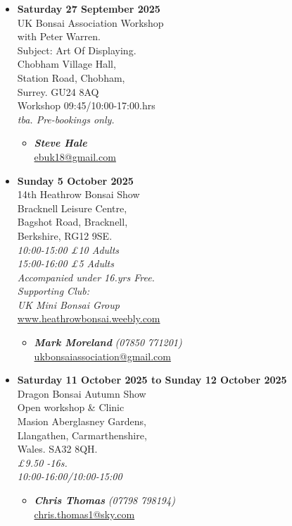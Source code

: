 \begin{itemize}
    \item \textbf{Saturday 27 September 2025}
    \\
    UK Bonsai Association Workshop \\
    with Peter Warren. \\
    Subject: Art Of Displaying. \\
    Chobham Village Hall, \\
    Station Road, Chobham, \\
    Surrey. GU24 8AQ \\
    Workshop 09:45/10:00-17:00.hrs
    \\
    \emph{tba. Pre-bookings only.}
    \begin{itemize}
        \item \textbf{\emph{Steve Hale}} \\
        \href{mailto:ebuk18@gmail.com}{ebuk18@gmail.com} 
    \end{itemize}

    \item \textbf{Sunday 5 October 2025}
    \\
    14th Heathrow Bonsai Show \\
    Bracknell Leisure Centre, \\
    Bagshot Road, Bracknell, \\
    Berkshire, RG12 9SE.
    \\
    \emph{10:00-15:00 £10 Adults} \\
    \emph{15:00-16:00 £5 Adults} \\
    \emph{Accompanied under 16.yrs Free.} \\
    \emph{Supporting Club:} \\
    \emph{UK Mini Bonsai Group}
    \\
    \href{http://www.heathrowbonsai.weebly.com/}{www.heathrowbonsai.weebly.com}
    \begin{itemize}
        \item \textbf{\emph{Mark Moreland}} \emph{(07850 771201)} \\
        \href{mailto:ukbonsaiassociation@gmail.com}{ukbonsaiassociation@gmail.com} 
    \end{itemize}

    \item \textbf{Saturday 11 October 2025 to Sunday 12 October 2025}
    \\
    Dragon Bonsai Autumn Show \\
    Open workshop \& Clinic \\
    Masion Aberglasney Gardens, \\
    Llangathen, Carmarthenshire, \\
    Wales. SA32 8QH.
    \\
    \emph{£9.50 -16s.} \\
    \emph{10:00-16:00/10:00-15:00}
    \begin{itemize}
        \item \textbf{\emph{Chris Thomas}} \emph{(07798 798194)} \\
        \href{mailto:chris.thomas1@sky.com}{chris.thomas1@sky.com} 
    \end{itemize}


\end{itemize}
